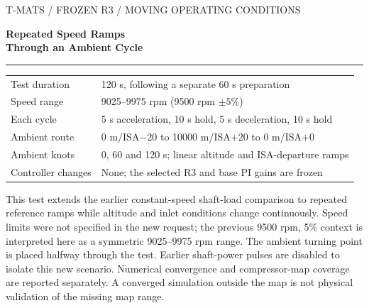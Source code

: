 \documentclass[11pt,a4paper]{article}
\begin{document}
\begin{titlepage}\color{navy}\sffamily
{\small T-MATS / FROZEN R3 / MOVING OPERATING CONDITIONS}\par\vspace{22mm}
{\fontsize{30}{36}\selectfont\bfseries Repeated Speed Ramps\\Through an Ambient Cycle\par}
\vspace{12mm}{\Large Fixed R3 versus base PI\par}
\vspace{10mm}\color{teal}\rule{\linewidth}{1.2pt}\color{navy}\vspace{8mm}
\begin{tabular}{ll}
Test duration & 120 s, following a separate 60 s preparation\\[5pt]
Speed range & 9025--9975 rpm (9500 rpm $\pm5\%$)\\[5pt]
Each cycle & 5 s acceleration, 10 s hold, 5 s deceleration, 10 s hold\\[5pt]
Ambient route & 0 m/ISA$-20$ to 10000 m/ISA$+20$ to 0 m/ISA$+0$\\[5pt]
Ambient knots & 0, 60 and 120 s; linear altitude and ISA-departure ramps\\[5pt]
Controller changes & None; the selected R3 and base PI gains are frozen
\end{tabular}
\par\vspace{12mm}\normalfont\color{ink}
This test extends the earlier constant-speed shaft-load comparison to repeated reference ramps while altitude and inlet conditions change continuously. Speed limits were not specified in the new request; the previous 9500 rpm, 5\% context is interpreted here as a symmetric 9025--9975 rpm range. The ambient turning point is placed halfway through the test. Earlier shaft-power pulses are disabled to isolate this new scenario.
\vfill Numerical convergence and compressor-map coverage are reported separately. A converged simulation outside the map is not physical validation of the missing map range.
\end{titlepage}
\end{document}
